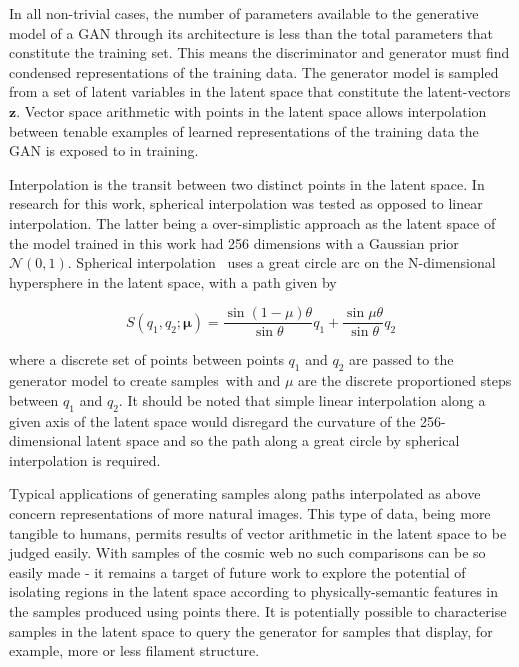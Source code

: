 \documentclass[twocolumn]{article}
\numberwithin{equation}{section}
\begin{document}
In all non-trivial cases, the number of parameters available to the generative model of a GAN through its architecture is 
less than the total parameters that constitute the training set. This means the discriminator and generator must find 
condensed representations of the training data. The generator model is sampled from a set of latent variables in the 
latent space that constitute the latent-vectors $\mathbf{z}$. Vector space arithmetic with points in the latent space 
allows interpolation between tenable examples of learned representations of the training data the GAN is exposed to in 
training. 

Interpolation is the transit between two distinct points in the latent space. In research for this work, spherical interpolation 
was tested as opposed to linear interpolation. The latter being a over-simplistic approach as the latent space of the model 
trained in this work had 256 dimensions with a Gaussian prior $\mathcal{N}(0,1)$. Spherical interpolation~\cite{spherical_interp} uses a great circle arc on the N-dimensional hypersphere in the latent space, with a path given by 

\begin{equation}
    S(q_1, q_2; \mathbf{\mu}) = \frac{\sin (1 - \mu)\theta}{\sin \theta}q_1 + \frac{\sin \mu\theta}{\sin \theta}q_2
\end{equation}

where a discrete set of points between points $q_1$ and $q_2$ are passed to the generator model to create samples~with and
$\mu$ are the discrete proportioned steps between $q_1$ and $q_2$. It should be noted that simple linear interpolation 
along a given axis of the latent space would disregard the curvature of the 256-dimensional latent space and so the path 
along a great circle by spherical interpolation is required.

Typical applications of generating samples along paths interpolated as above concern representations of more natural images.
This type of data, being more tangible to humans, permits results of vector arithmetic in the latent space to be judged easily.
With samples of the cosmic web no such comparisons can be so easily made - it remains a target of future work to explore the 
potential of isolating regions in the latent space according to physically-semantic features in the samples produced using points
there. It is potentially possible to characterise samples in the latent space to query the generator for samples that display, for
example, more or less filament structure. 
\end{document}
